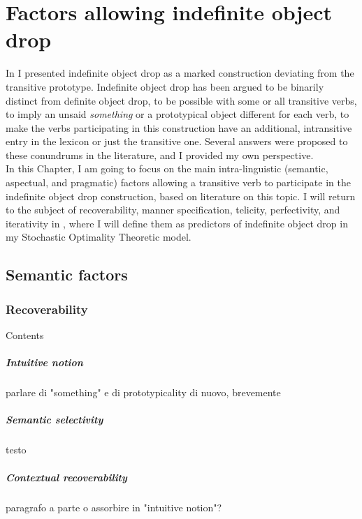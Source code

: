 \setchapterpreamble[u]{\margintoc}
\chapter{Factors allowing indefinite object drop}

In  I presented indefinite object drop as a marked construction deviating from the transitive prototype. Indefinite object drop has been argued to be binarily distinct from definite object drop, to be possible with some or all transitive verbs, to imply an unsaid \textit{something} or a prototypical object different for each verb, to make the verbs participating in this construction have an additional, intransitive entry in the lexicon or just the transitive one. Several answers were proposed to these conundrums in the literature, and I provided my own perspective.\\
In this Chapter, I am going to focus on the main intra-linguistic (semantic, aspectual, and pragmatic) factors allowing a transitive verb to participate in the indefinite object drop construction, based on literature on this topic. I will return to the subject of recoverability, manner specification, telicity, perfectivity, and iterativity in , where I will define them as predictors of indefinite object drop in my Stochastic Optimality Theoretic model.


\section{Semantic factors} 

\subsection{Recoverability} 

Contents

\paragraph{Intuitive notion}
parlare di "something" e di prototypicality di nuovo, brevemente

\paragraph{Semantic selectivity}
testo

\paragraph{Contextual recoverability}
paragrafo a parte o assorbire in "intuitive notion"?

